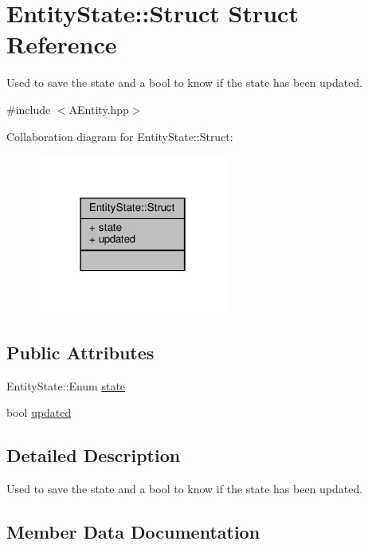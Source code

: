 \hypertarget{struct_entity_state_1_1_struct}{}\section{Entity\+State\+:\+:Struct Struct Reference}
\label{struct_entity_state_1_1_struct}


Used to save the state and a bool to know if the state has been updated.  




{\ttfamily \#include $<$A\+Entity.\+hpp$>$}



Collaboration diagram for Entity\+State\+:\+:Struct\+:
\nopagebreak
\begin{figure}[H]
\begin{center}
\leavevmode
\includegraphics[width=178pt]{struct_entity_state_1_1_struct__coll__graph}
\end{center}
\end{figure}
\subsection*{Public Attributes}
\begin{DoxyCompactItemize}
\item 
Entity\+State\+::\+Enum \hyperlink{struct_entity_state_1_1_struct_a4d56748cabf40d03ff64ff052b08a024}{state}
\item 
bool \hyperlink{struct_entity_state_1_1_struct_ab388472336f3bc953d83554990003c0e}{updated}
\end{DoxyCompactItemize}


\subsection{Detailed Description}
Used to save the state and a bool to know if the state has been updated. 

\subsection{Member Data Documentation}
\mbox{\label{struct_entity_state_1_1_struct_a4d56748cabf40d03ff64ff052b08a024}} 
